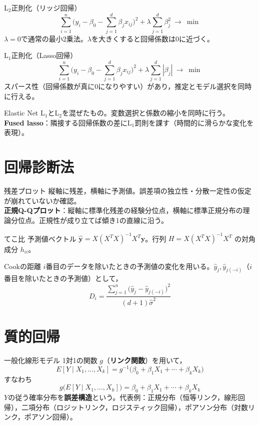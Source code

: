 \documentclass[a4paper,11pt]{ltjsarticle}
\begin{document}
\begin{term}{L$_2$正則化（リッジ回帰）}
\[
\sum_{i=1}^n\Big(y_i-\beta_0-\sum_{j=1}^d \beta_jx_{ij}\Big)^2 + \lambda\sum_{j=1}^d\beta_j^2 \ \to\ \min
\]
$\lambda=0$で通常の最小2乗法。$\lambda$を大きくすると回帰係数は0に近づく。
\end{term}

\begin{term}{L$_1$正則化（Lasso回帰）}
\[
\sum_{i=1}^n\Big(y_i-\beta_0-\sum_{j=1}^d \beta_jx_{ij}\Big)^2 + \lambda\sum_{j=1}^d|\beta_j| \ \to\ \min
\]
スパース性（回帰係数が真に0になりやすい）があり，推定とモデル選択を同時に行える。
\end{term}

\begin{term}{Elastic Net}
L$_1$とL$_2$を混ぜたもの。変数選択と係数の縮小を同時に行う。\\
\textbf{Fused lasso}：隣接する回帰係数の差にL$_1$罰則を課す（時間的に滑らかな変化を表現）。
\end{term}

\section{回帰診断法}

\begin{term}{残差プロット}
縦軸に残差，横軸に予測値。誤差項の独立性・分散一定性の仮定が崩れていないか確認。\\
\textbf{正規Q-Qプロット}：縦軸に標準化残差の経験分位点，横軸に標準正規分布の理論分位点。正規性が成り立てば傾き1の直線に沿う。
\end{term}

\begin{term}{てこ比}
予測値ベクトル $\hat{\bm y}=X(X^TX)^{-1}X^T\bm y$。行列 $H=X(X^TX)^{-1}X^T$ の対角成分 $h_{ii}$。
\end{term}

\begin{term}{Cookの距離}
$i$番目のデータを除いたときの予測値の変化を用いる。$\hat y_j,\hat y_{j(-i)}$（$i$番目を除いたときの予測値）として，
\[
D_i = \frac{\sum_{j=1}^n\big(\hat y_j - \hat y_{j(-i)}\big)^2}{(d+1)\hat\sigma^2}
\]
\end{term}

\section{質的回帰}

\begin{term}{一般化線形モデル}
1対1の関数 $g$（\textbf{リンク関数}）を用いて，
\[
E[Y\mid X_1,\dots,X_k] = g^{-1}\big(\beta_0+\beta_1X_1+\cdots+\beta_kX_k\big)
\]
すなわち
\[
g\big(E[Y\mid X_1,\dots,X_k]\big) = \beta_0+\beta_1X_1+\cdots+\beta_kX_k
\]
$Y$の従う確率分布を\textbf{誤差構造}という。代表例：正規分布（恒等リンク，線形回帰），二項分布（ロジットリンク，ロジスティック回帰），ポアソン分布（対数リンク，ポアソン回帰）。
\end{term}
\end{document}
